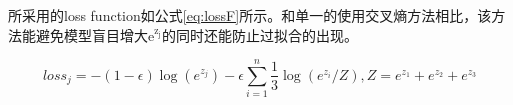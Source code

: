 \documentclass[a4paper,11pt]{article}
\begin{document}
所采用的loss function如公式\ref{eq:lossF}所示。和单一的使用交叉熵方法相比，该方法能避免模型盲目增大e\(^{\text{z}_{\text{j}}}\)的同时还能防止过拟合的出现。

\begin{equation}
\label{eq:lossF}
loss_j = - (1-\epsilon)\log{(e^{z_j})} - \epsilon \sum_{i=1}^n \frac{1}{3} \log{(e^{z_i}/Z)}, Z=e^{z_1}+ e^{z_2}+e^{z_3}
\end{equation}





\end{document}

